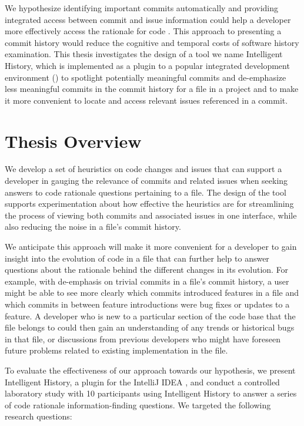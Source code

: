 We hypothesize  identifying important commits automatically and providing integrated access between commit 
and issue information could help a developer more effectively access the rationale for code .
This approach to presenting a commit history would reduce the cognitive and temporal costs of software history examination. 
This thesis investigates the design of a tool we name Intelligent History, 
which is implemented as a plugin to a popular integrated development environment () 
to spotlight potentially meaningful commits and de-emphasize 
less meaningful commits in the commit history for a file in a project and to make it more convenient 
to locate and access relevant issues referenced in a commit. 


\section{Thesis Overview}

We develop a set of heuristics on code changes and issues that can support a developer 
in gauging the relevance of commits and related issues when seeking answers 
to code rationale questions pertaining to a file.
The design of the tool supports experimentation about how effective the heuristics are 
for streamlining the process of viewing both commits and associated issues in one interface, 
while also reducing the noise in a file's commit history.

We anticipate this approach will make it more convenient for a developer to gain insight into the evolution of code in a file that can further help to answer questions about the rationale behind the different changes in its evolution. 
For example, with de-emphasis on trivial commits in a file's commit history, a user might be able to see more clearly which commits introduced features in a file and which commits in between feature introductions were bug fixes or updates to a feature.
A developer who is new to a particular section of the code base that the file belongs to could then gain an understanding of any trends or historical bugs in that file, 
or discussions from previous developers who might have foreseen future problems related to  existing implementation in the file.

To evaluate the effectiveness of our approach towards our hypothesis, 
we present Intelligent History, a plugin for the IntelliJ IDEA ,
and conduct a controlled laboratory study with 10 participants using Intelligent History to answer a series of code rationale information-finding questions.
We targeted the following research questions:

